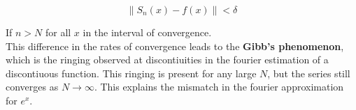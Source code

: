 \documentclass[11pt]{article}
\begin{document}
\[ \| S_n(x) - f(x) \| <  \delta\]

If \(n>N\) for all \(x\) in the interval of convergence.\\
This difference in the rates of convergence leads to the \textbf{Gibb's
phenomenon}, which is the ringing observed at discontiuities in the
fourier estimation of a discontiuous function. This ringing is present
for any large \(N\), but the series still converges as \(N \to \infty\).
This explains the mismatch in the fourier approximation for \(e^x\).

	


    
    
    
    
\end{document}
